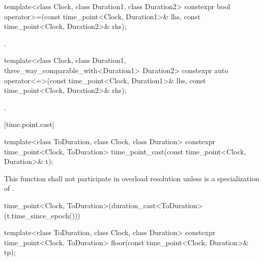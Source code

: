 %
\begin{itemdecl}
template<class Clock, class Duration1, class Duration2>
  constexpr bool operator>=(const time_point<Clock, Duration1>& lhs,
                            const time_point<Clock, Duration2>& rhs);
\end{itemdecl}

\begin{itemdescr}
\pnum
\returns
{}.
\end{itemdescr}

%
\begin{itemdecl}
template<class Clock, class Duration1,
         three_way_comparable_with<Duration1> Duration2>
  constexpr auto operator<=>(const time_point<Clock, Duration1>& lhs,
                             const time_point<Clock, Duration2>& rhs);
\end{itemdecl}

\begin{itemdescr}
\pnum
\returns
{}.
\end{itemdescr}

[time.point.cast]{}

%
%
\begin{itemdecl}
template<class ToDuration, class Clock, class Duration>
  constexpr time_point<Clock, ToDuration> time_point_cast(const time_point<Clock, Duration>& t);
\end{itemdecl}

\begin{itemdescr}
\pnum
\remarks
This function shall not participate in overload resolution
unless  is a specialization of .

\pnum
\returns
\begin{codeblock}
time_point<Clock, ToDuration>(duration_cast<ToDuration>(t.time_since_epoch()))
\end{codeblock}
\end{itemdescr}

%
\begin{itemdecl}
template<class ToDuration, class Clock, class Duration>
  constexpr time_point<Clock, ToDuration> floor(const time_point<Clock, Duration>& tp);
\end{itemdecl}

